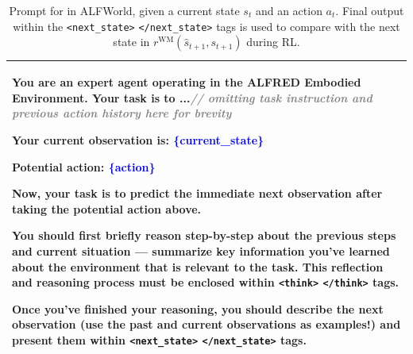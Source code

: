 \begin{table}[t!]
    \caption{Prompt for \wmrlshort{} in ALFWorld, given a current state $s_t$ and an action $a_t$. Final output within the \texttt{<next\_state>} \texttt{</next\_state>} tags is used to compare with the next state in $r^{\textrm{WM}}(\hat{s}_{t+1}, s_{t+1})$ during RL.}
    \label{tab:alfred_wmrl_prompt}
    \begin{tabular}{p{16.5cm}}
    \toprule
    You are an expert agent operating in the ALFRED Embodied Environment. Your task is to ...\emph{\textcolor{gray}{// omitting task instruction and previous action history here for brevity}}
    \newline

    Your current observation is:
    \textcolor{blue}{\{}\textcolor{blue}{current\_state}\textcolor{blue}{\}}


    \textbf{Potential action:}
    \textcolor{blue}{\{}\textcolor{blue}{action}\textcolor{blue}{\}}
    \newline

    Now, your task is to predict the immediate next observation after taking the potential action above.

    You should first briefly reason step-by-step about the previous steps and current situation — summarize key information you've learned about the environment that is relevant to the task. This reflection and reasoning process \textbf{must} be enclosed within \texttt{<think>} \texttt{</think>} tags.

    Once you've finished your reasoning, you should describe the next observation (use the past and current observations as examples!) and present them within \texttt{<next\_state>} \texttt{</next\_state>} tags.
    \\
    \bottomrule
    \end{tabular}
\end{table}


